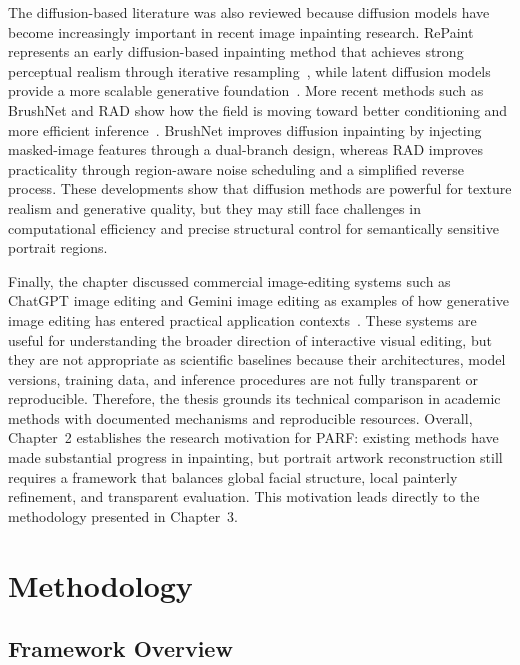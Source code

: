 \documentclass[12pt, twoside]{report}
\begin{document}
The diffusion-based literature was also reviewed because diffusion models have become increasingly important in recent image inpainting research. RePaint represents an early diffusion-based inpainting method that achieves strong perceptual realism through iterative resampling~\cite{lugmayr2022repaint}, while latent diffusion models provide a more scalable generative foundation~\cite{rombach2022ldm}. More recent methods such as BrushNet and RAD show how the field is moving toward better conditioning and more efficient inference~\cite{ju2024brushnet,kim2025rad}. BrushNet improves diffusion inpainting by injecting masked-image features through a dual-branch design, whereas RAD improves practicality through region-aware noise scheduling and a simplified reverse process. These developments show that diffusion methods are powerful for texture realism and generative quality, but they may still face challenges in computational efficiency and precise structural control for semantically sensitive portrait regions.

Finally, the chapter discussed commercial image-editing systems such as ChatGPT image editing and Gemini image editing as examples of how generative image editing has entered practical application contexts~\cite{openai_chatgpt_images,openai_chatgpt_editing,google_gemini_images,google_gemini_editing}. These systems are useful for understanding the broader direction of interactive visual editing, but they are not appropriate as scientific baselines because their architectures, model versions, training data, and inference procedures are not fully transparent or reproducible. Therefore, the thesis grounds its technical comparison in academic methods with documented mechanisms and reproducible resources. Overall, Chapter~2 establishes the research motivation for PARF: existing methods have made substantial progress in inpainting, but portrait artwork reconstruction still requires a framework that balances global facial structure, local painterly refinement, and transparent evaluation. This motivation leads directly to the methodology presented in Chapter~3.



\chapter{Methodology}

\section{Framework Overview}
\end{document}
